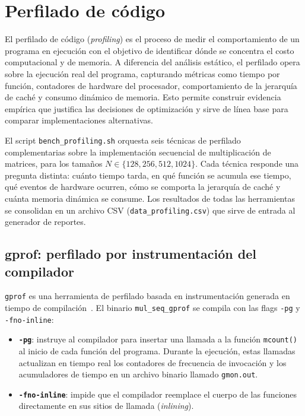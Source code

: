 \section{Perfilado de código}

El perfilado de código (\textit{profiling}) es el proceso de medir el comportamiento
de un programa en ejecución con el objetivo de identificar dónde se concentra el
costo computacional y de memoria.
A diferencia del análisis estático, el perfilado opera sobre la ejecución real del
programa, capturando métricas como tiempo por función, contadores de hardware del
procesador, comportamiento de la jerarquía de caché y consumo dinámico de memoria.
Esto permite construir evidencia empírica que justifica las decisiones de optimización
y sirve de línea base para comparar implementaciones alternativas.

El script \texttt{bench\_profiling.sh} orquesta seis técnicas de perfilado
complementarias sobre la implementación secuencial de multiplicación de matrices,
para los tamaños $N \in \{128, 256, 512, 1024\}$.
Cada técnica responde una pregunta distinta: cuánto tiempo tarda, en qué función
se acumula ese tiempo, qué eventos de hardware ocurren, cómo se comporta la
jerarquía de caché y cuánta memoria dinámica se consume.
Los resultados de todas las herramientas se consolidan en un archivo CSV
(\texttt{data\_profiling.csv}) que sirve de entrada al generador de reportes.


\subsection{gprof: perfilado por instrumentación del compilador}

\texttt{gprof} es una herramienta de perfilado basada en instrumentación generada
en tiempo de compilación~\parencite{graham1982gprof}.
El binario \texttt{mul\_seq\_gprof} se compila con las flags \texttt{-pg} y
\texttt{-fno-inline}:

\begin{itemize}
    \item \textbf{\texttt{-pg}}: instruye al compilador para insertar una llamada a
        la función \texttt{mcount()} al inicio de cada función del programa.
        Durante la ejecución, estas llamadas actualizan en tiempo real los
        contadores de frecuencia de invocación y los acumuladores de tiempo en un
        archivo binario llamado \texttt{gmon.out}.
    \item \textbf{\texttt{-fno-inline}}: impide que el compilador reemplace el cuerpo
        de las funciones directamente en sus sitios de llamada (\textit{inlining}).
        
\end{itemize}

